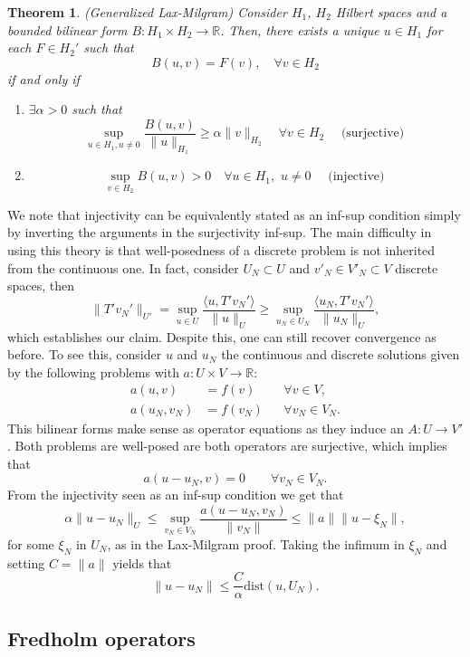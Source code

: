 \documentclass{article}
\newcommand{\R}{\mathbb{R}}
\newtheorem{theorem}{Theorem}
\begin{document}
\begin{theorem}(Generalized Lax-Milgram)
    Consider \(H_1\), \(H_2\) Hilbert spaces and a bounded bilinear form 
    \(B:H_1\times H_2 \to \mathbb{R}\). Then, there exists a unique \(u\in H_1\) for each 
    \(F\in H_2'\) such that \[B(u,v) = F(v),\quad \forall v \in H_2\] if and only if 
    \begin{enumerate}
        \item \(\exists \alpha > 0\) such that \[\sup_{u\in H_1,u\neq 0}
        \frac{B(u,v)}{\lVert u \rVert_{H_1}} \ge \alpha \lVert v \rVert_{H_2}
        \quad \forall v\in H_2\quad \text{ (surjective) }\]
        \item \[\sup_{v\in H_2} B(u,v) > 0 
        \quad \forall u\in H_1,\,\, u\neq 0
        \quad \text{ (injective) }\]
    \end{enumerate}
\end{theorem}
We note that injectivity can be equivalently stated as an inf-sup condition simply by inverting the arguments in the surjectivity inf-sup.  The main difficulty in using this theory is that well-posedness of a discrete problem is not inherited from the continuous one. In fact, consider $U_N\subset U$ and $v'_N\in V'_N\subset V$ discrete spaces, then 
$$ \|T'v_N'\|_{U'} = \sup_{u\in U}\frac{\langle u, T'v_N'\rangle}{\|u\|_U} \geq \sup_{u_N\in U_N}\frac{\langle u_N, T'v_N'\rangle}{\|u_N\|_U}, $$
which establishes our claim. Despite this, one can still recover convergence as before. To see this, consider $u$ and $u_N$ the continuous and discrete solutions given by the following problems with $a:U\times V \to \R$:
    $$\begin{aligned}
        a(u,v) &= f(v) &&\forall v\in V,\\
        a(u_N, v_N) &= f(v_N) &&\forall v_N\in V_N.
    \end{aligned}$$
This bilinear forms make sense as operator equations as they induce an $A:U\to V'$. Both problems are well-posed are both operators are surjective, which implies that 
    $$ a(u-u_N, v) = 0  \qquad \forall v_N \in V_N. $$
From the injectivity seen as an inf-sup condition we get that
$$ \alpha \| u - u_N \|_U \leq \sup_{v_N\in V_N} \frac{a(u-u_N, v_N)}{\|v_N\|} \leq \| a \| \|u - \xi_N \|, $$
for some $\xi_N$ in $U_N$, as in the Lax-Milgram proof. Taking the infimum in $\xi_N$ and setting $C=\|a\|$ yields that
    $$ \| u - u_N \| \leq \frac{C}{\alpha}\text{dist}(u, U_N). $$


\subsection{Fredholm operators}
\end{document}
